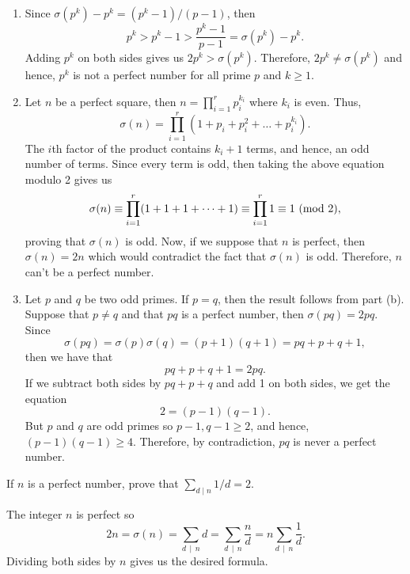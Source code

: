 \begin{solution}
    \begin{enumerate}
        \item Since $\sigma(p^k) - p^k = (p^k - 1)/(p-1)$, then
        $$p^k > p^k - 1 > \frac{p^k - 1}{p- 1} = \sigma(p^k) - p^k.$$
        Adding $p^k$ on both sides gives us $2p^k > \sigma(p^k)$. Therefore, $2p^k \neq \sigma(p^k)$ and hence, $p^k$ is not a perfect number for all prime $p$ and $k \geq 1$.
        \item Let $n$ be a perfect square, then $n = \prod_{i=1}^{r}p_i^{k_i}$ where $k_i$ is even. Thus,
        $$\sigma(n) = \prod_{i=1}^{r}(1 + p_i + p_i^2 + \dots + p_i^{k_i}).$$
        The $i$th factor of the product contains $k_i + 1$ terms, and hence, an odd number of terms. Since every term is odd, then taking the above equation modulo 2 gives us
        $$\sigma(n) \equiv \prod_{i=1}^{r}(1 + 1 + 1 + \dots + 1) \equiv \prod_{i=1}^{r}1 \equiv 1 \ (\mathrm{mod}\ 2),$$
        proving that $\sigma(n)$ is odd. Now, if we suppose that $n$ is perfect, then $\sigma(n) = 2n$ which would contradict the fact that $\sigma(n)$ is odd. Therefore, $n$ can't be a perfect number.
        \item Let $p$ and $q$ be two odd primes. If $p = q$, then the result follows from part (b). Suppose that $p \neq q$ and that $pq$ is a perfect number, then $\sigma(pq) = 2pq$. Since
        $$\sigma(pq) = \sigma(p)\sigma(q) = (p+1)(q+1) = pq + p + q + 1,$$
        then we have that
        $$pq + p + q + 1 = 2pq.$$
        If we subtract both sides by $pq + p + q$ and add 1 on both sides, we get the equation
        $$2 = (p-1)(q-1).$$
        But $p$ and $q$ are odd primes so $p-1, q-1 \geq 2$, and hence, $(p-1)(q-1)\geq 4$. Therefore, by contradiction, $pq$ is never a perfect number. \\
    \end{enumerate}
\end{solution}

\begin{exercise}
    If $n$ is a perfect number, prove that $\sum_{d \mid n}1/d = 2$. \\
\end{exercise}

\begin{solution}
    The integer $n$ is perfect so
    $$2n = \sigma(n) = \sum_{d \, \mid \, n}d = \sum_{d \, \mid \, n}\frac{n}{d} = n\sum_{d \, \mid \, n}\frac{1}{d}.$$
    Dividing both sides by $n$ gives us the desired formula. \\
\end{solution}

